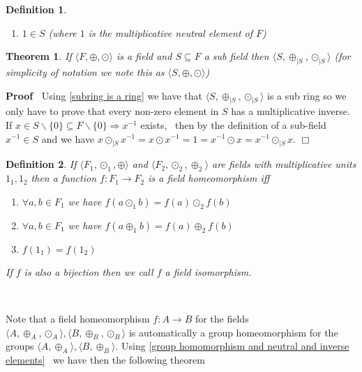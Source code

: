 \documentclass{book}
\newcommand{\nobracket}{}
\newenvironment{proof}{\noindent\textbf{Proof\ }}{\hspace*{\fill}$\Box$\medskip}
\newtheorem{definition}{Definition}
{\theorembodyfont{\rmfamily}\newtheorem{example}{Example}}
\newtheorem{theorem}{Theorem}
\begin{document}
{{\begin{definition}
\begin{enumerate}
    \item $1 \in S$ (where $1$ is the multiplicative neutral element of $F$)
  \end{enumerate}
\end{definition}

\begin{theorem}
  If $\langle F, \oplus, \odot \rangle$ is a field and $S \subseteq F$ a sub
  field then $\langle S, \oplus_{| S \nobracket}, \odot_{| S \nobracket}
  \rangle$ (for simplicity of notation we note this as $\langle S, \oplus,
  \odot \rangle$) 
\end{theorem}

\begin{proof}
  Using \ref{subring is a ring} we have that $\langle S, \oplus_{| S
  \nobracket}, \odot_{| S \nobracket} \rangle$ is a sub ring so we only have
  to prove that every non-zero element in $S$ has a multiplicative inverse. If
  $x \in S \backslash \{ 0 \} \subseteq F\backslash \{ 0 \} \Rightarrow x^{-
  1}$ exists, \ then by the definition of a sub-field $x^{- 1} \in S$ and we
  have $x \odot_{| S \nobracket} x^{- 1} = x \odot x^{- 1} = 1 = x^{- 1} \odot
  x = x^{- 1} \odot_{| S \nobracket} x$.
\end{proof}

\begin{definition}
  \label{field homomorphism}If $\langle F_1, \odot_1, \oplus \rangle$ and
  $\langle F_2, \odot_2, \oplus_2 \rangle$ are fields with multiplicative
  units $1_1, 1_2$ then a function $f : F_1 \rightarrow F_2$ is a field
  homeomorphism iff
  \begin{enumerate}
    \item $\forall a, b \in F_1$ we have $f (a \odot_1 b) = f (a) \odot_2 f
    (b)$
    
    \item $\forall a, b \in F_1$ we have $f (a \oplus_1 b) = f (a) \oplus_2 f
    (b)$
    
    \item $f (1_1) = f (1_2)$
  \end{enumerate}
  If $f$ is also a bijection then we call $f$ a field isomorphism.
\end{definition}

\

Note that a field homeomorphism $f : A \rightarrow B$ for the fields $\langle
A, \oplus_A, \odot_A \rangle, \langle B, \oplus_B, \odot_B \rangle$ is
automatically a group homeomorphism for the groups $\langle A, \oplus_A
\rangle, \langle B, \oplus_B \rangle$. Using \ref{group homomorphism and
neutral and inverse elements} \ we have then the following theorem

}}
\end{document}
